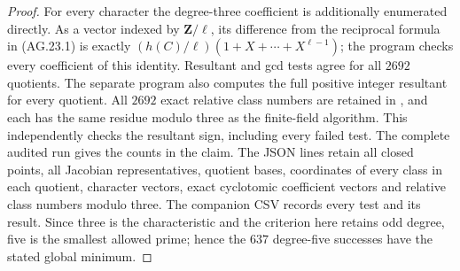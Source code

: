 \begin{proof}
For every character the degree-three coefficient is
additionally enumerated directly. As a vector indexed
by $\mathbf Z/\ell$, its difference from the reciprocal
formula in (AG.23.1) is exactly
$(h(C)/\ell)(1+X+\cdots+X^{\ell-1})$; the program
checks every coefficient of this identity. Resultant
and gcd tests agree for all $2692$ quotients.
The separate program 
also computes the full positive integer resultant for
every quotient. All $2692$ exact relative class numbers
are retained in
, and each has
the same residue modulo three as the finite-field
algorithm. This independently checks the resultant sign,
including every failed test.
The complete audited run gives the counts in the
claim. The JSON lines retain all closed points,
all Jacobian representatives, quotient bases,
coordinates of every class in each quotient,
character vectors, exact cyclotomic coefficient
vectors and relative class numbers modulo three.
The companion CSV records every test and its result.
Since three is the characteristic and the criterion
here retains odd degree, five is the smallest allowed
prime; hence the $637$ degree-five successes have
the stated global minimum.
\end{proof}

